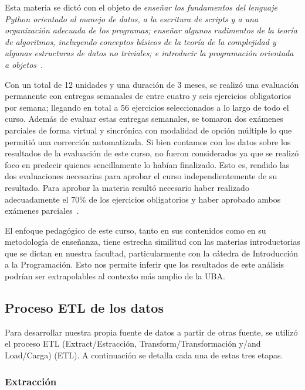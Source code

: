 \documentclass[11pt,a4paper,twoside,openany]{tesis}
\begin{document}
Esta materia se dictó con el objeto de \emph{enseñar los fundamentos del lenguaje Python orientado al manejo de datos, a la escritura de \emph{scripts} y a una organización adecuada de los programas; enseñar  algunos  rudimentos  de  la  teoría  de  algoritmos,  incluyendo  conceptos  básicos  de  la teoría de la complejidad y algunas estructuras de datos no triviales; e introducir la programación orientada a objetos}~\cite{unsam2020}.

Con un total de 12 unidades y una duración de 3 meses, se realizó una evaluación permanente con entregas semanales de entre cuatro y seis ejercicios obligatorios por semana; llegando en total a  56  ejercicios  seleccionados  a  lo  largo  de  todo  el  curso.  Además  de  evaluar  estas  entregas semanales, se tomaron dos exámenes parciales de forma virtual y sincrónica con modalidad de opción múltiple lo que permitió una corrección automatizada. Si bien contamos con los datos sobre los resultados de la evaluación de este curso, no fueron considerados ya que se realizó foco en predecir quienes sencillamente lo habían finalizado. Esto es, rendido las dos evaluaciones necesarias para aprobar el curso independientemente de su resultado. Para aprobar la materia resultó necesario haber realizado adecuadamente el 70\% de los  ejercicios  obligatorios  y  haber  aprobado  ambos  exámenes  parciales~\cite{unsam2020}.

El enfoque pedagógico de este curso, tanto en sus contenidos como en su metodología de enseñanza, tiene estrecha similitud con las materias introductorias que se dictan en nuestra facultad, particularmente con la cátedra de Introducción a la Programación. Esto nos permite inferir que los resultados de este análisis podrían ser extrapolables al contexto más amplio de la UBA.


\subsection{Proceso ETL de los datos}

Para desarrollar nuestra propia fuente de datos a partir de otras fuente, se utilizó el proceso ETL (Extract/Estracción, Transform/Transformación y/and Load/Carga) (ETL). A continuación se detalla cada una de estas tres etapas.

\subsubsection{Extracción}\textbf{ }
\end{document}
